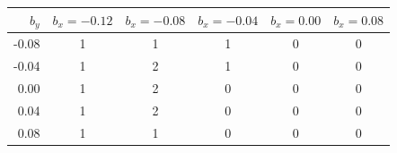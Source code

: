 \begin{tabular}{rccccc}
\toprule
$b_y$ & $b_x=-0.12$ & $b_x=-0.08$ & $b_x=-0.04$ & $b_x=0.00$ & $b_x=0.08$ \\
\midrule
-0.08 & 1 & 1 & 1 & 0 & 0 \\
-0.04 & 1 & 2 & 1 & 0 & 0 \\
0.00 & 1 & 2 & 0 & 0 & 0 \\
0.04 & 1 & 2 & 0 & 0 & 0 \\
0.08 & 1 & 1 & 0 & 0 & 0 \\
\bottomrule
\end{tabular}